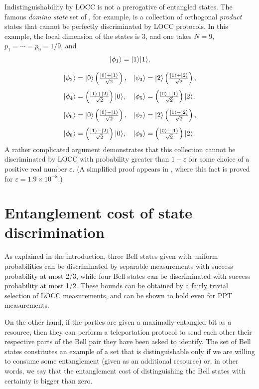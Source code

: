 Indistinguishability by LOCC is not a prerogative of entangled states. 
The famous \emph{domino state} set of \cite{Bennett99}, for example, is a 
collection of orthogonal \emph{product} states that cannot be perfectly 
discriminated by LOCC protocols.
In this example, the local dimension of the states is $3$, and one takes
$N = 9$, $p_1 = \cdots = p_9 = 1/9$, and
{\setlength{\arraycolsep}{2.5mm}%
\begin{equation} \label{eq:domino}
\begin{array}{ll}
  \multicolumn{2}{c}{\ket{\phi_1} = \ket{1}\ket{1},}\\[4mm]
  \ket{\phi_2} = \ket{0}\left(\frac{\ket{0} + \ket{1}}{\sqrt{2}}\right),
  & \ket{\phi_3} = \ket{2}\left(\frac{\ket{1} + \ket{2}}{\sqrt{2}}\right),
  \\[4mm]
  \ket{\phi_4} = \left(\frac{\ket{1} + \ket{2}}{\sqrt{2}}\right)\ket{0},
  & \ket{\phi_5} = \left(\frac{\ket{0} + \ket{1}}{\sqrt{2}}\right)\ket{2},
  \\[4mm]
  \ket{\phi_6} = \ket{0}\left(\frac{\ket{0} - \ket{1}}{\sqrt{2}}\right),
  & \ket{\phi_7} = \ket{2}\left(\frac{\ket{1} - \ket{2}}{\sqrt{2}}\right),
  \\[4mm]
  \ket{\phi_8} = \left(\frac{\ket{1} - \ket{2}}{\sqrt{2}}\right)\ket{0},
  & \ket{\phi_9} = \left(\frac{\ket{0} - \ket{1}}{\sqrt{2}}\right)\ket{2}.
\end{array}
\end{equation}
}%
A rather complicated argument demonstrates that this collection cannot be
discriminated by LOCC with probability greater than $1 - \varepsilon$ for some choice
of a positive real number $\varepsilon$.
(A simplified proof appears in \cite{Childs13}, where this fact
is proved for $\varepsilon = 1.9 \times 10^{-8}$.)



\section{Entanglement cost of state discrimination}

As explained in the introduction, three Bell states given with uniform
probabilities can be discriminated by separable measurements with success
probability at most 2/3, while four Bell states can be discriminated with success
probability at most 1/2.
These bounds can be obtained by a fairly trivial selection of LOCC
measurements, and can be shown to hold even for PPT measurements.

On the other hand, if the parties are given a maximally entangled bit as a resource,
then they can perform a teleportation protocol to send each other their respective parts of 
the Bell pair they have been asked to identify.
The set of Bell states constitutes an example of a set that is distinguishable only if we 
are willing to consume some entanglement (given as an additional resource) or, in other words, 
we say that the entanglement cost of distinguishing the Bell states with certainty is bigger than zero.

